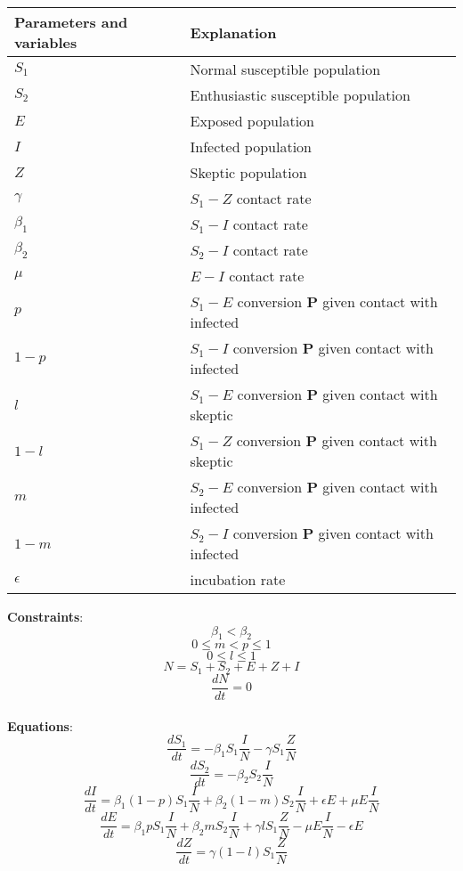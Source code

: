 \documentclass{article}
\begin{document}
\begin{center}

\begin{tabu} to 0.8\textwidth { | X[l] | X[r] |}
 \hline
 Parameters and variables& Explanation \\
 \hline
 $S_1$  & Normal susceptible population  \\
\hline
 $S_2$ & Enthusiastic susceptible population\\
 \hline
 $E$ & Exposed population  \\
 \hline
 $I$ & Infected population  \\
 \hline
 $Z$ & Skeptic population \\
  \hline
 $\gamma$ & $S_1-Z$ contact rate \\
 \hline
 ${\beta}_1$ & $S_1-I$ contact rate \\
 \hline
 ${\beta}_2$ & $S_2-I$ contact rate \\
 \hline
 $\mu$ & $E-I$ contact rate \\
 \hline
 $p$ & $S_1-E$ conversion $\mathbf{P}$ given contact with infected \\
 \hline
 $1-p$ & $S_1-I$ conversion $\mathbf{P}$ given contact with infected \\
 \hline
 $l$ & $S_1-E$ conversion $\mathbf{P}$ given contact with skeptic \\
 \hline
 $1-l$ & $S_1-Z$ conversion $\mathbf{P}$ given contact with skeptic \\
 \hline
 $m$ & $S_2-E$ conversion $\mathbf{P}$ given contact with infected \\
 \hline
 $1-m$ & $S_2-I$ conversion $\mathbf{P}$ given contact with infected \\
 \hline
 $\epsilon$ & incubation rate \\
 \hline
 

\end{tabu}
\end{center}
\textbf{Constraints}: 
$${\beta}_1 < {\beta}_2$$  
$$0\leq m<p\leq 1$$  
$$0\leq l \leq 1$$ 
$$N = S_1 + S_2 + E + Z + I$$
$$\frac{dN}{dt}=0$$
\\
\textbf{Equations}: 
$$ \frac{dS_1}{dt} = -{\beta}_1 S_1\frac{I}{N} -\gamma S_1\frac{Z}{N}$$
$$ \frac{dS_2}{dt} = -{\beta}_2 S_2\frac{I}{N}$$
$$\frac{dI}{dt} = {\beta}_1 (1-p)S_1\frac{I}{N} + {\beta}_2 (1-m)S_2\frac{I}{N} + \epsilon E + \mu E\frac{I}{N}$$
$$\frac{dE}{dt} = {\beta}_1 pS_1\frac{I}{N} + {\beta}_2 mS_2\frac{I}{N} + \gamma       lS_1\frac{Z}{N} - \mu E\frac{I}{N} - \epsilon E$$
$$\frac{dZ}{dt} =  \gamma (1-l)S_1\frac{Z}{N}$$
\end{document}
